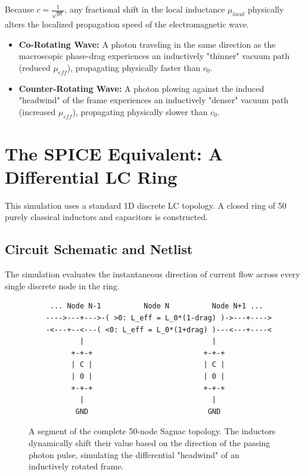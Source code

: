 Because $c = \frac{1}{\sqrt{\mu \epsilon}}$, any fractional shift in the local inductance $\mu_{local}$ physically alters the localized propagation speed of the electromagnetic wave. 

\begin{itemize}
    \item \textbf{Co-Rotating Wave:} A photon traveling in the same direction as the macroscopic phase-drag experiences an inductively "thinner" vacuum path (reduced $\mu_{eff}$), propagating physically faster than $c_0$.
    \item \textbf{Counter-Rotating Wave:} A photon plowing against the induced "headwind" of the frame experiences an inductively "denser" vacuum path (increased $\mu_{eff}$), propagating physically slower than $c_0$.
\end{itemize}

\section{The SPICE Equivalent: A Differential LC Ring}
This simulation uses a standard 1D discrete LC topology. A closed ring of 50 purely classical inductors and capacitors is constructed.

\subsection{Circuit Schematic and Netlist}
The simulation evaluates the instantaneous direction of current flow across every single discrete node in the ring. 

\begin{figure}[h!]
    \centering
    \begin{tcolorbox}[colback=black!5!white, colframe=black!75!white, title=Simplified LTspice Equivalent Circuit (Sagnac Ring Segment)]
    \centering
    \begin{verbatim}
     ... Node N-1          Node N          Node N+1 ...
    ---->---+--->-( >0: L_eff = L_0*(1-drag) )->---+---->
    -<---+--<---( <0: L_eff = L_0*(1+drag) )---<---+----<
            |                              |
          +-+-+                          +-+-+
          | C |                          | C |
          | 0 |                          | 0 |
          +-+-+                          +-+-+
            |                              |
           GND                            GND
    \end{verbatim}
    \end{tcolorbox}
    \caption{A segment of the complete 50-node Sagnac topology. The inductors dynamically shift their value based on the direction of the passing photon pulse, simulating the differential "headwind" of an inductively rotated frame.}
\end{figure}

